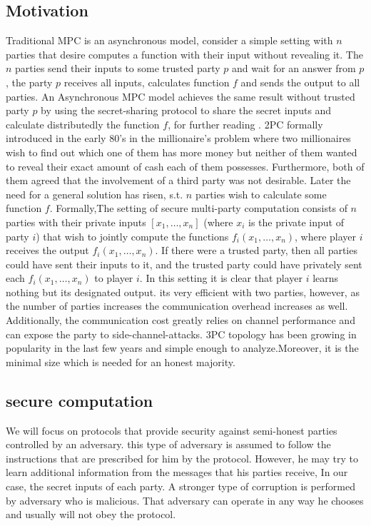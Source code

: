 \documentclass[12pt]{article}
\begin{document}
\subsection{Motivation}
Traditional MPC is an asynchronous model, consider a simple setting with $n$ parties that desire computes a function with their input without revealing it. The $n$ parties send their inputs to some trusted party $p$ and wait for an answer from $p$, the party $p$ receives all inputs, calculates function $f$ and sends the output to all parties. An Asynchronous MPC model achieves the same result without trusted party $p$ by using the secret-sharing protocol to share the secret inputs and calculate distributedly the function $f$, for further reading \cite{sync_async}. 
2PC formally introduced in the early 80’s in the millionaire’s problem where two millionaires wish to find out which one of them has more money but neither of them wanted to reveal their exact amount of cash each of them possesses. Furthermore, both of them agreed that the involvement of a third party was not desirable. Later the need for a general solution has risen, s.t. $n$ parties wish to calculate some function $f$.  Formally,The setting of secure multi-party computation consists of $n$ parties with their private inputs $[x_1, \ldots ,x_n]$ (where $x_i$ is the private input of party $i$) that wish to jointly compute the functions $f_i(x_1, \ldots ,x_n)$, where player $i$ receives the output  $f_i(x_1, \ldots ,x_n)$. If there were a trusted party, then all parties could have sent their inputs to it, and the trusted party could have privately sent each  $f_i(x_1, \ldots ,x_n)$ to player $i$. In this setting it is clear that player $i$ learns nothing but its designated output. its very efficient with two parties, however, as the number of parties increases the communication overhead increases as well. Additionally, the communication cost greatly relies on channel performance and can expose the party to side-channel-attacks. 3PC topology has been growing in popularity in the last few years and  simple enough to analyze.Moreover, it is the minimal size which is needed for an honest majority.

\subsection{secure computation}
We will focus on protocols that provide security against semi-honest parties controlled by an adversary. this type of adversary is assumed to follow the instructions that are prescribed for him by the protocol. However, he may try to learn additional information from the messages that his parties receive, In our case, the secret inputs of each party. A stronger type of corruption is performed by adversary who is malicious. That adversary can operate in any way he chooses and usually will not obey the protocol.
\end{document}

